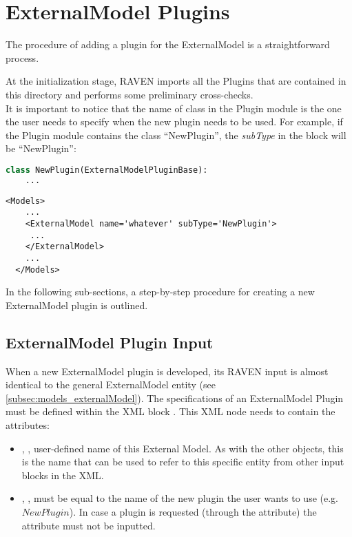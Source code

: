 \section{ExternalModel Plugins}
\label{sec:newExternalModelPlugin}

The procedure of adding a plugin for the ExternalModel is a straightforward process.

At the initialization stage, RAVEN imports all the Plugins that are contained in this directory and performs some preliminary cross-checks.
\\It is important to notice that the name of class in the Plugin module is the one the user needs to specify when the new plugin
needs to be used. For example, if the Plugin module contains the class 	``NewPlugin'', the \textit{subType} in the  block will be 	``NewPlugin'':
\begin{lstlisting}[language=python]
  class NewPlugin(ExternalModelPluginBase):
    ...
\end{lstlisting}
\begin{lstlisting}[style=XML,morekeywords={name,file}] %moreemph={name,file}]
  <Models>
    ...
    <ExternalModel name='whatever' subType='NewPlugin'>
     ...
    </ExternalModel>
    ...
  </Models>
\end{lstlisting}

In the following sub-sections, a step-by-step procedure for creating a new ExternalModel plugin is outlined.

\subsection{ExternalModel Plugin Input}
\label{subsec:externalModelPluginInput}
When a new ExternalModel plugin is developed, its RAVEN input is almost identical
to the general ExternalModel entity (see \ref{subsec:models_externalModel}).
The specifications of an ExternalModel Plugin must be defined within the XML block
.
%
This XML node needs to contain the attributes:

\vspace{-5mm}
\begin{itemize}
  \itemsep0em
  \item {}, , user-defined name
  of this External Model.
  \nb As with the other objects, this is the name that can be used to refer to
  this specific entity from other input blocks in the XML.
  \item {}, , must be equal to the
  name of the new plugin the user wants to use (e.g. $NewPlugin$).
  \nb In case a plugin is requested (through the   attribute) the
  attribute  must not be inputted.
\end{itemize}
\vspace{-5mm}

